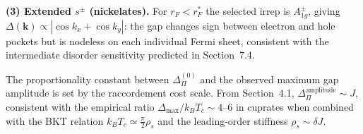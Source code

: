     \textbf{(3) Extended $s^\pm$ (nickelates).}
    For $r_F < r_F^*$ the selected irrep is $A_{1g}^\pm$, giving
    $\Delta(\mathbf{k}) \propto |\cos k_x + \cos k_y|$: the gap changes sign between electron
    and hole pockets but is nodeless on each individual Fermi sheet, consistent with the
    intermediate disorder sensitivity predicted in Section~7.4.

    The proportionality constant between $\Delta_\Pi^{(0)}$ and the observed maximum gap
    amplitude is set by the raccordement cost scale.
    From Section~4.1, $\Delta_\Pi^\textrm{amplitude} \sim J$, consistent with the empirical ratio
    $\Delta_{\max}/k_BT_c \sim 4$--$6$ in cuprates when combined with the BKT relation
    $k_BT_c \simeq \frac{\pi}{2}\rho_s$ and the leading-order stiffness $\rho_s \sim \delta J$.
